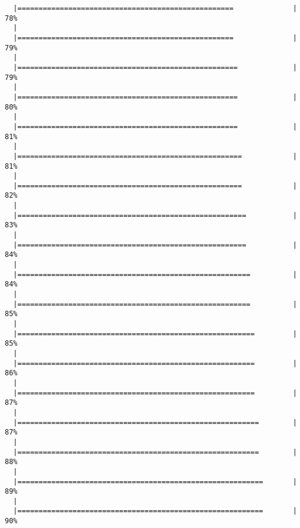 \begin{knitrout}
\begin{kframe}
\begin{verbatim}
  |===================================================              |  78%
  |                                                                       
  |===================================================              |  79%
  |                                                                       
  |====================================================             |  79%
  |                                                                       
  |====================================================             |  80%
  |                                                                       
  |====================================================             |  81%
  |                                                                       
  |=====================================================            |  81%
  |                                                                       
  |=====================================================            |  82%
  |                                                                       
  |======================================================           |  83%
  |                                                                       
  |======================================================           |  84%
  |                                                                       
  |=======================================================          |  84%
  |                                                                       
  |=======================================================          |  85%
  |                                                                       
  |========================================================         |  85%
  |                                                                       
  |========================================================         |  86%
  |                                                                       
  |========================================================         |  87%
  |                                                                       
  |=========================================================        |  87%
  |                                                                       
  |=========================================================        |  88%
  |                                                                       
  |==========================================================       |  89%
  |                                                                       
  |==========================================================       |  90%

\end{verbatim}
\end{kframe}
\end{knitrout}
